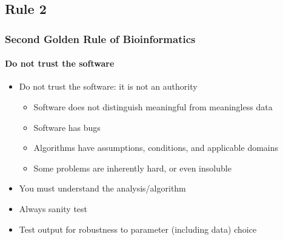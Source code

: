 %

\subsection{Rule 2}
\begin{frame}
  \frametitle{Second Golden Rule of Bioinformatics}
  \framesubtitle{Do not trust the software}
  \begin{itemize}
    \item Do not trust the software: it is not an authority
    \begin{itemize}
      \item Software does not distinguish meaningful from meaningless data
      \item Software has bugs
      \item Algorithms have assumptions, conditions, and applicable domains
      \item Some problems are inherently hard, or even insoluble
    \end{itemize}
    \item You must understand the analysis/algorithm
    \item Always sanity test
    \item Test output for robustness to parameter (including data) choice
  \end{itemize}
\end{frame}